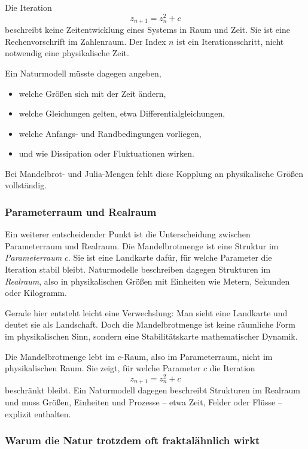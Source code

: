 Die Iteration
\[
z_{n+1}=z_n^2+c
\]
beschreibt keine Zeitentwicklung eines Systems in Raum und Zeit.
Sie ist eine Rechenvorschrift im Zahlenraum.
Der Index $n$ ist ein Iterationsschritt,
nicht notwendig eine physikalische Zeit.

Ein Naturmodell müsste dagegen angeben,
\begin{itemize}
\item welche Größen sich mit der Zeit ändern,
\item welche Gleichungen gelten, etwa Differentialgleichungen,
\item welche Anfangs- und Randbedingungen vorliegen,
\item und wie Dissipation oder Fluktuationen wirken.
\end{itemize}
Bei Mandelbrot- und Julia-Mengen fehlt diese Kopplung an physikalische Größen vollständig.

\subsubsection*{Parameterraum und Realraum}

Ein weiterer entscheidender Punkt ist die Unterscheidung zwischen Parameterraum und Realraum.
Die Mandelbrotmenge ist eine Struktur im \emph{Parameterraum} $c$.
Sie ist eine Landkarte dafür,
für welche Parameter die Iteration stabil bleibt.
Naturmodelle beschreiben dagegen Strukturen im \emph{Realraum},
also in physikalischen Größen mit Einheiten wie Metern, Sekunden oder Kilogramm.

Gerade hier entsteht leicht eine Verwechslung:
Man sieht eine \glqq Landkarte\grqq{}
und deutet sie als \glqq Landschaft\grqq.
Doch die Mandelbrotmenge ist keine räumliche Form im physikalischen Sinn,
sondern eine Stabilitätskarte mathematischer Dynamik.

\begin{NoteBox}
\label{box:unterscheidung}
\small
Die Mandelbrotmenge lebt im $c$-Raum,
also im Parameterraum,
nicht im physikalischen Raum.
Sie zeigt,
für welche Parameter $c$ die Iteration
\[
z_{n+1}=z_n^2+c
\]
beschränkt bleibt.
Ein Naturmodell dagegen beschreibt Strukturen im Realraum
und muss Größen, Einheiten und Prozesse
-- etwa Zeit, Felder oder Flüsse --
explizit enthalten.
\end{NoteBox}

\subsubsection*{Warum die Natur trotzdem oft fraktalähnlich wirkt}

